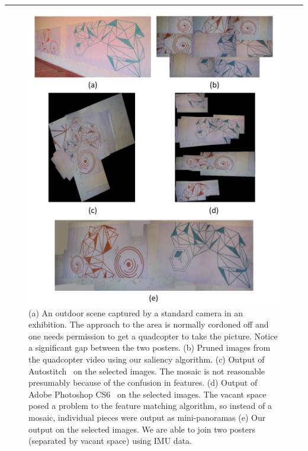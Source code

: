 \documentclass[10pt,twocolumn,letterpaper]{article}
\begin{document}
\hrule
% 
% 

\begin{figure}[h!]
\centering
\includegraphics[width=0.85\linewidth]{figures/orange_blue.pdf}
\caption{(a) An outdoor scene captured by a standard camera in an
  exhibition. The approach to the area is normally cordoned off and one
  needs permission to get a quadcopter to take the picture.  Notice a
  significant gap between the two posters.  (b) Pruned images from the
  quadcopter video using our saliency algorithm. (c) Output of
  Autostitch~\cite{autostitch} on the selected images. The mosaic is not
  reasonable presumably because of the confusion in features. (d) Output of Adobe
  Photoshop CS6~\cite{photoshop} on the selected images. The vacant space posed
  a problem to the feature matching algorithm, so instead of a mosaic,
  individual pieces were output as mini-panoramas (e) Our output on
  the selected images. We are able to join two posters (separated by
  vacant space) using IMU data.}
\label{fig:results1}
\end{figure}
\end{document}
